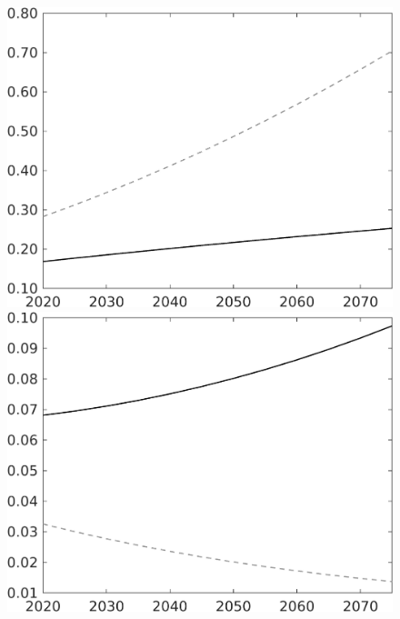 \documentclass[12pt]{article}
\begin{document}
\begin{figure}[h!!]
\begin{minipage}[]{0.32\textwidth}
	\end{minipage}	
	\begin{minipage}[]{0.32\textwidth}
		\includegraphics[width=1\textwidth]{../../codding_model/own_basedOnFried/optimalPol_010922_revision/figures/all_13Sept22/LevTaufNoTauf_TaulCalib_regime0_F_spillover0_nsk1_xgr0_knspil1_sep1_LFlimit0_emsbase0_countec0_GovRev0_etaa0.79_lgd0.png}
	\end{minipage}	
	\begin{minipage}[]{0.32\textwidth}
		\includegraphics[width=1\textwidth]{../../codding_model/own_basedOnFried/optimalPol_010922_revision/figures/all_13Sept22/LevTaufNoTauf_TaulCalib_regime0_G_spillover0_nsk1_xgr0_knspil1_sep1_LFlimit0_emsbase0_countec0_GovRev0_etaa0.79_lgd0.png}

\end{minipage}
\end{figure}
\end{document}
